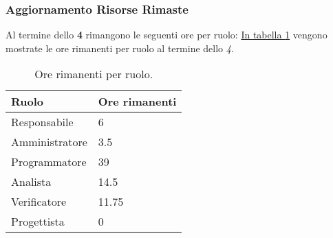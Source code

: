 \subsubsection{Aggiornamento Risorse Rimaste}
\label{sec:AggiornamentoRisorse_Sprint4}
Al termine dello \textbf{ 4} rimangono le seguenti ore per ruolo: \hyperref[tab:sprint4_ore_rimanenti]{In tabella \ref{tab:sprint4_ore_rimanenti}} vengono mostrate le ore rimanenti per ruolo al termine dello \textit{ 4}.

\begin{table}[H]
    \centering
    \begin{tabular}{| l | l |}
    \hline
    \textbf{Ruolo} & 
    \textbf{Ore rimanenti}\\
    \hline
        Responsabile & 6 \\
    \hline
        Amministratore & 3.5 \\
    \hline
        Programmatore & 39\\
    \hline
        Analista & 14.5\\
    \hline
        Verificatore & 11.75\\
    \hline
        Progettista & 0\\
    \hline
    \end{tabular}
    \caption{Ore rimanenti per ruolo.}
    \label{tab:sprint4_ore_rimanenti} 
\end{table}